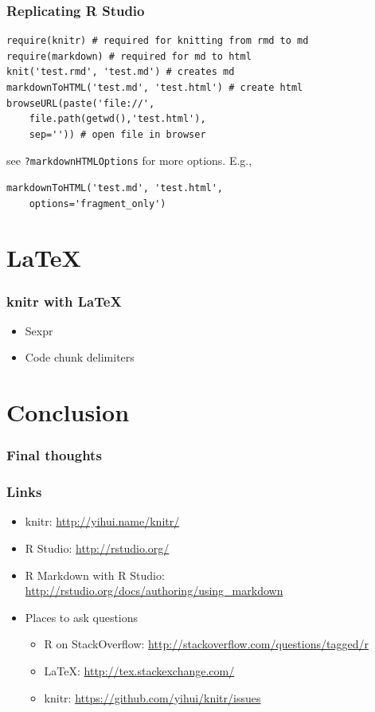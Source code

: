 \begin{frame}[fragile]\frametitle{Replicating R Studio}

\begin{verbatim}
require(knitr) # required for knitting from rmd to md
require(markdown) # required for md to html 
knit('test.rmd', 'test.md') # creates md 
markdownToHTML('test.md', 'test.html') # create html
browseURL(paste('file://', 
    file.path(getwd(),'test.html'), 
    sep='')) # open file in browser
\end{verbatim}

see \texttt{?markdownHTMLOptions} for more options. E.g.,

\begin{verbatim}
markdownToHTML('test.md', 'test.html', 
    options='fragment_only')
\end{verbatim}

\end{frame}

\section{LaTeX}

\begin{frame}\frametitle{knitr with LaTeX}

\begin{itemize}
\item
  Sexpr
\item
  Code chunk delimiters
\end{itemize}

\end{frame}

\section{Conclusion}

\begin{frame}\frametitle{Final thoughts}

\end{frame}

\begin{frame}[fragile]\frametitle{Links}

\begin{itemize}
\item
  knitr: \url{http://yihui.name/knitr/}
\item
  R Studio: \url{http://rstudio.org/}
\item
  R Markdown with R Studio:
  \url{http://rstudio.org/docs/authoring/using_markdown}
\item
  Places to ask questions

  \begin{itemize}
  \item
    R on StackOverflow:
    \url{http://stackoverflow.com/questions/tagged/r}
  \item
    LaTeX: \url{http://tex.stackexchange.com/}
  \item
    knitr: \url{https://github.com/yihui/knitr/issues}
  \end{itemize}
\end{itemize}

\end{frame}
